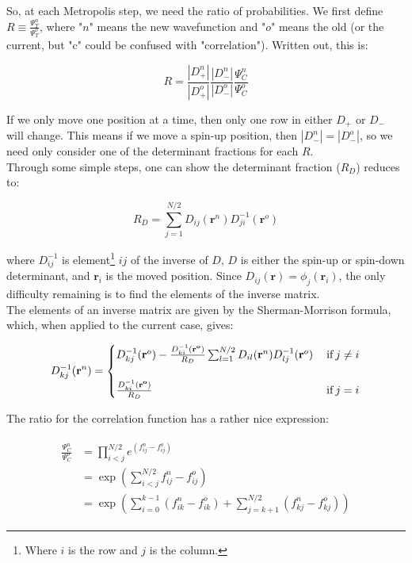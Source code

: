 \documentclass[english, a4paper]{article}
\newcommand{\bm}[1]{\mathbf{#1}}
\begin{document}
	So, at each Metropolis step, we need the ratio of probabilities. We first define $R\equiv\frac{\Psi_T^n}{\Psi_T^o}$, where "$n$" means the new wavefunction and "$o$" means the old (or the current, but "c" could be confused with "correlation"). Written out, this is:
	
	\begin{equation}
	R = \frac{|D_+^n|}{|D_+^o|}\frac{|D_-^n|}{|D_-^o|}\frac{\Psi_C^n}{\Psi_C^o}
	\end{equation}
	
	If we only move one position at a time, then only one row in either $D_+$ or $D_-$ will change. This means if we move a spin-up position, then $|D_-^n| = |D_-^o|$, so we need only consider one of the determinant fractions for each $R$.\\
	Through some simple steps, one can show the determinant fraction ($R_{D}$) reduces to:
	
	\begin{equation}
	R_D = \sum_{j=1}^{N/2} D_{ij}(\bm{r}^n)D_{ji}^{-1}(\bm{r}^o)
	\end{equation}
	
	where $D_{ij}^{-1}$ is element\footnote{Where $i$ is the row and $j$ is the column.} $ij$ of the inverse of $D$, $D$ is either the spin-up or spin-down determinant, and $\bm{r}_i$ is the moved position. Since $D_{ij}(\bm{r}) = \phi_j(\bm{r}_i)$, the only difficulty remaining is to find the elements of the inverse matrix.\\
	
	The elements of an inverse matrix are given by the Sherman-Morrison formula, which, when applied to the current case, gives:
	
	\begin{equation}
	D_{kj}^{-1}(\bm{r}^n) =
	\begin{cases}
	D_{kj}^{-1}(\bm{r}^o) - \frac{D_{ki}^{-1}(\bm{r^o})}{R_D}\sum_{l=1}^{N/2}D_{il}(\bm{r}^n)D_{lj}^{-1}(\bm{r}^o) \:&\text{if}\: j\neq i\\ \vspace{1pt}\\
	\frac{D_{ki}^{-1}(\bm{r^o})}{R_D} \:&\text{if}\: j = i \\
	\end{cases}
	\label{eq:update_inverse_SD}
	\end{equation}
	
	The ratio for the correlation function has a rather nice expression:
	
	\begin{align}
	\begin{split}
	\frac{\Psi_C^n}{\Psi_C^o} &= \prod_{i<j}^{N/2} e^{(f_{ij}^n-f_{ij}^o)}\\
	&= \exp\left( \sum_{i<j}^{N/2} f_{ij}^n - f_{ij}^o \right)\\
	&= \exp\left(\sum_{i=0}^{k-1}(f_{ik}^n - f_{ik}^o) + \sum_{j=k+1}^{N/2}(f_{kj}^n - f_{kj}^o)\right)
	\end{split}
	\end{align}
	
\end{document}
